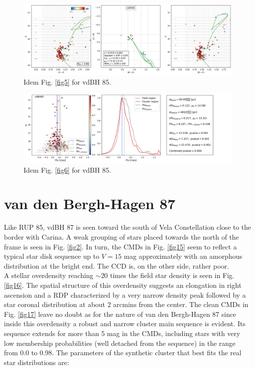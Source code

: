 \documentclass[draft]{aa}
\begin{document}
\begin{figure}[ht]
    \centering
    \includegraphics[width=\hsize]{../figs/cmds_vdbh85.png}
    \caption{Idem Fig. \ref{fig5} for vdBH 85.}
    \label{fig13}
\end{figure}

\begin{figure}[ht]
    \centering
    \includegraphics[width=\hsize]{../figs/plx_vdBH85.png}
    \caption{Idem Fig. \ref{fig6} for vdBH 85.}
    \label{fig14}
\end{figure}



\section{van den Bergh-Hagen 87}

Like RUP 85, vdBH 87 is seen toward the south of Vela Constellation close to
the border with Carina. A weak grouping of stars placed towards the north of
the frame is seen in Fig. \ref{fig2}. In turn, the CMDs in Fig. \ref{fig15}
seem to reflect a typical star disk sequence up to $V = 15$ mag approximately
with an amorphous distribution at the bright end. The CCD is, on the other
side, rather poor.\\

A stellar overdensity reaching $\sim20$ times the field star density is
seen in Fig. \ref{fig16}. The spatial structure of this overdensity suggests an
elongation in right ascension and a RDP characterized by a very narrow density
peak followed by a star coronal distribution at about 2 arcmins from the center.
The clean CMDs in Fig. \ref{fig17} leave no doubt as for the nature of van den
Bergh-Hagen 87 since inside this overdensity a robust and narrow cluster main
sequence is evident. Its sequence extends for more than 5 mag in the
CMDs, including stars with very low membership probabilities (well detached
from the sequence) in the range from 0.0 to 0.98. The parameters of the
synthetic cluster that best fits the real star distributions are:
\end{document}
